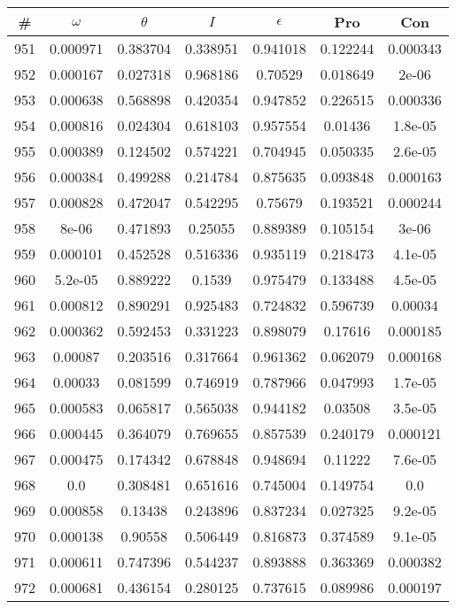 \newpage
\begin{table}
\begin{tabular}{c|c|c|c|c|c|c}
\# & $\omega$ & $\theta$ & $I$ & $\epsilon$ & Pro & Con\\
\hline
951 & 0.000971 & 0.383704 & 0.338951 & 0.941018 & 0.122244 & 0.000343\\
952 & 0.000167 & 0.027318 & 0.968186 & 0.70529 & 0.018649 & 2e-06\\
953 & 0.000638 & 0.568898 & 0.420354 & 0.947852 & 0.226515 & 0.000336\\
954 & 0.000816 & 0.024304 & 0.618103 & 0.957554 & 0.01436 & 1.8e-05\\
955 & 0.000389 & 0.124502 & 0.574221 & 0.704945 & 0.050335 & 2.6e-05\\
956 & 0.000384 & 0.499288 & 0.214784 & 0.875635 & 0.093848 & 0.000163\\
957 & 0.000828 & 0.472047 & 0.542295 & 0.75679 & 0.193521 & 0.000244\\
958 & 8e-06 & 0.471893 & 0.25055 & 0.889389 & 0.105154 & 3e-06\\
959 & 0.000101 & 0.452528 & 0.516336 & 0.935119 & 0.218473 & 4.1e-05\\
960 & 5.2e-05 & 0.889222 & 0.1539 & 0.975479 & 0.133488 & 4.5e-05\\
961 & 0.000812 & 0.890291 & 0.925483 & 0.724832 & 0.596739 & 0.00034\\
962 & 0.000362 & 0.592453 & 0.331223 & 0.898079 & 0.17616 & 0.000185\\
963 & 0.00087 & 0.203516 & 0.317664 & 0.961362 & 0.062079 & 0.000168\\
964 & 0.00033 & 0.081599 & 0.746919 & 0.787966 & 0.047993 & 1.7e-05\\
965 & 0.000583 & 0.065817 & 0.565038 & 0.944182 & 0.03508 & 3.5e-05\\
966 & 0.000445 & 0.364079 & 0.769655 & 0.857539 & 0.240179 & 0.000121\\
967 & 0.000475 & 0.174342 & 0.678848 & 0.948694 & 0.11222 & 7.6e-05\\
968 & 0.0 & 0.308481 & 0.651616 & 0.745004 & 0.149754 & 0.0\\
969 & 0.000858 & 0.13438 & 0.243896 & 0.837234 & 0.027325 & 9.2e-05\\
970 & 0.000138 & 0.90558 & 0.506449 & 0.816873 & 0.374589 & 9.1e-05\\
971 & 0.000611 & 0.747396 & 0.544237 & 0.893888 & 0.363369 & 0.000382\\
972 & 0.000681 & 0.436154 & 0.280125 & 0.737615 & 0.089986 & 0.000197\\

\end{tabular}
\end{table}
